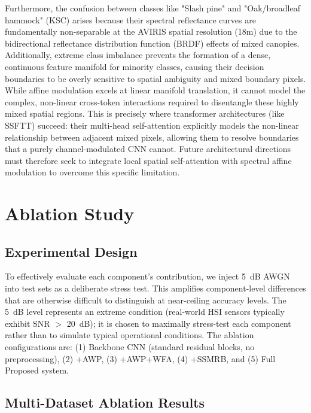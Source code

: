 \documentclass[conference]{IEEEtran}
\begin{document}
{Furthermore, the confusion between classes like "Slash pine" and "Oak/broadleaf hammock" (KSC) arises because their spectral reflectance curves are fundamentally non-separable at the AVIRIS spatial resolution (18m) due to the bidirectional reflectance distribution function (BRDF) effects of mixed canopies. Additionally, extreme class imbalance prevents the formation of a dense, continuous feature manifold for minority classes, causing their decision boundaries to be overly sensitive to spatial ambiguity and mixed boundary pixels. While affine modulation excels at linear manifold translation, it cannot model the complex, non-linear cross-token interactions required to disentangle these highly mixed spatial regions. This is precisely where transformer architectures (like SSFTT) succeed: their multi-head self-attention explicitly models the non-linear relationship between adjacent mixed pixels, allowing them to resolve boundaries that a purely channel-modulated CNN cannot. Future architectural directions must therefore seek to integrate local spatial self-attention with spectral affine modulation to overcome this specific limitation.

\section{Ablation Study}

\subsection{Experimental Design}

To effectively evaluate each component's contribution, we inject 5~dB AWGN into test sets as a deliberate stress test. This amplifies component-level differences that are otherwise difficult to distinguish at near-ceiling accuracy levels. The 5~dB level represents an extreme condition (real-world HSI sensors typically exhibit SNR $>$ 20~dB); it is chosen to maximally stress-test each component rather than to simulate typical operational conditions. The ablation configurations are: (1) Backbone CNN (standard residual blocks, no preprocessing), (2) +AWP, (3) +AWP+WFA, (4) +SSMRB, and (5) Full Proposed system.

\subsection{Multi-Dataset Ablation Results}

}
\end{document}
